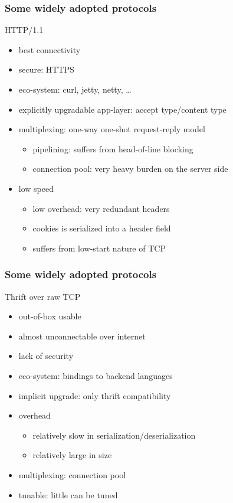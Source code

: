 \documentclass[lualatex]{beamer}
\begin{document}
\begin{frame}
  \frametitle{Some widely adopted protocols}

  \begin{block}{HTTP/1.1}
    \begin{itemize}
    \item best connectivity
    \item secure: HTTPS
    \item eco-system: curl, jetty, netty, \dots
    \item explicitly upgradable app-layer: accept type/content type
    \item multiplexing: one-way one-shot request-reply model
      \begin{itemize}
      \item pipelining: suffers from head-of-line blocking
      \item connection pool: very heavy burden on the server side
      \end{itemize}
    \item low speed
      \begin{itemize}
      \item low overhead: very redundant headers
      \item cookies is serialized into a header field
      \item suffers from low-start nature of TCP
      \end{itemize}
    \end{itemize}
  \end{block}
\end{frame}

\begin{frame}
  \frametitle{Some widely adopted protocols}

  \begin{block}{Thrift over raw TCP}
    \begin{itemize}
    \item out-of-box usable
    \item almost unconnectable over internet
    \item lack of security
    \item eco-system: bindings to backend languages
    \item implicit upgrade: only thrift compatibility
    \item overhead
      \begin{itemize}
      \item relatively slow in serialization/deserialization
      \item relatively large in size
      \end{itemize}
    \item multiplexing: connection pool
    \item tunable: little can be tuned
    \end{itemize}
  \end{block}
\end{frame}
\end{document}
